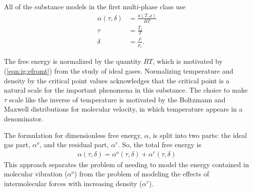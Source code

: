 All of the substance models in the first multi-phase class use
\begin{subequations}
\begin{align}
\alpha(\tau,\delta) &= \frac{a(T,\rho)}{R T}\\
\tau &= \frac{T_c}{T}\\
\delta &= \frac{\rho}{\rho_c}.
\end{align}
\end{subequations}

The free energy is normalized by the quantity $R T$, which is motivated by (\ref{eqn:ig:efromt}) from the study of ideal gases.  Normalizing temperature and density by the critical point values acknowledges that the critical point is a natural scale for the important phenomena in this substance.  The choice to make $\tau$ scale like the inverse of temperature is motivated by the Boltzmann and Maxwell distributions for molecular velocity, in which temperature appears in a denominator.

The formulation for dimensionless free energy, $\alpha$, is split into two parts: the ideal gas part, $\alpha^o$, and the residual part, $\alpha^r$.  So, the total free energy is
\begin{align}
\alpha(\tau, \delta) = \alpha^o(\tau, \delta) + \alpha^r(\tau, \delta)
\end{align}
This approach separates the problem of needing to model the energy contained in molecular vibration ($\alpha^o$) from the problem of modeling the effects of intermolecular forces with increasing density ($\alpha^r$).

